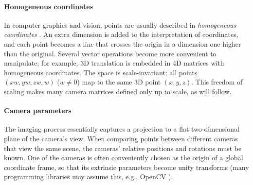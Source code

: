 

\paragraph{Homogeneous coordinates}
In computer graphics and vision, points are usually described in \emph{homogeneous coordinates} \cite{dubrofsky2009homography,hartley03multiview,heyden2005multiple}.
An extra dimension is added to the interpretation of coordinates, and each point becomes a line that crosses the origin in a dimension one higher than the original.
Several vector operations become more convenient to manipulate; for example, 3D translation is embedded in 4D matrices with homogeneous coordinates.
The space is scale-invariant; all points $(xw, yw, zw, w)$ ($w \neq 0$) map to the same 3D point $(x, y, z)$.
This freedom of scaling makes many camera matrices defined only up to scale, as will follow.


\paragraph{Camera parameters}
The imaging process essentially captures a projection to a flat two-dimensional plane of the camera's view.
When comparing points between different cameras that view the same scene, the cameras' relative positions and rotations must be known.
One of the cameras is often conveniently chosen as the origin of a global coordinate frame, so that its extrinsic parameters become unity transforms (many programming libraries may assume this, e.g., OpenCV \cite{opencv}).

